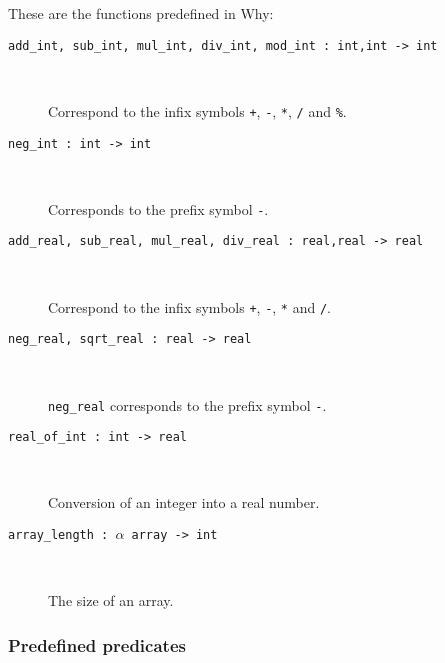\documentclass[a4paper,12pt]{report}
\newcommand{\why}{\textsf{Why}}
\begin{document}
These are the functions predefined in \why:
\begin{description}
\item[\texttt{add\_int, sub\_int, mul\_int, div\_int, mod\_int :
    int,int -> int}] ~\par
  Correspond to the infix symbols
  \texttt{+}, \texttt{-}, \texttt{*}, \texttt{/} and \texttt{\%}.
\item[\texttt{neg\_int : int -> int}] ~\par
  Corresponds to the prefix symbol \texttt{-}.
\item[\texttt{add\_real, sub\_real, mul\_real, div\_real :
    real,real -> real}] ~\par
  Correspond to the infix symbols
  \texttt{+}, \texttt{-}, \texttt{*} and \texttt{/}.
\item[\texttt{neg\_real, sqrt\_real : real -> real}] ~\par
  \texttt{neg\_real} corresponds to the prefix symbol \texttt{-}.
\item[\texttt{real\_of\_int : int -> real}] ~\par
  Conversion of an integer into a real number.
\item[\texttt{array\_length : $\alpha$ array -> int}] ~\par
  The size of an array.
\end{description}

\subsubsection{Predefined predicates}
\end{document}
